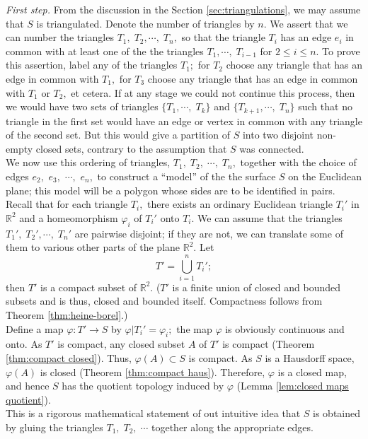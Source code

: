 \documentclass{article}
\theoremstyle{definition}
\begin{document}
\emph{First step.} From the discussion in the Section \ref{sec:triangulations}, we may assume that $S$ is triangulated. Denote the number of triangles by $n.$ We assert that we can number the triangles $T_1,\; T_2, \cdots,\; T_n,$ so that the triangle $T_i$ has an edge $e_i$ in common with at least one of the the triangles $T_1, \cdots,\; T_{i-1}$ for $2 \le i \le n.$ To prove this assertion, label any of the triangles $T_1;$ for $T_2$ choose any triangle that has an edge in common with $T_1,$ for $T_3$ choose any triangle that has an edge in common with $T_1$ or $T_2,$ et cetera. If at any stage we could not continue this process, then we would have two sets of triangles $\{T_1, \cdots,\; T_k\}$ and $\{T_{k+1}, \cdots,\; T_n\}$ such that no triangle in the first set would have an edge or vertex in common with any triangle of the second set. But this would give a partition of $S$ into two disjoint non-empty closed sets, contrary to the assumption that $S$ was connected.\\
We now use this ordering of triangles, $T_1,\;T_2,\;\cdots,\;T_n,$ together with the choice of edges $e_2,$ $e_3,$ $\cdots,$ $e_n,$ to construct a ``model'' of the the surface $S$ on the Euclidean plane; this model will be a polygon whose sides are to be identified in pairs. Recall that for each triangle $T_i,$ there exists an ordinary Euclidean triangle $T_i'$ in $\mathbb{R}^2$ and a homeomorphism $\varphi_i$ of $T_i'$ onto $T_i.$ We can assume that the triangles $T_1',\;T_2',\cdots,\;T_n'$ are pairwise disjoint; if they are not, we can translate some of them to various other parts of the plane $\mathbb{R}^2.$ Let
\[T' = \bigcup_{i=1}^nT_i';\]
then $T'$ is a compact subset of $\mathbb{R}^2.$ ($T'$ is a finite union of closed and bounded subsets and is thus, closed and bounded itself. Compactness follows from Theorem \ref{thm:heine-borel}.)\\
Define a map $\varphi:T'\longrightarrow S$ by $\varphi|T_i' = \varphi_i;$ the map $\varphi$ is obviously continuous and onto. As $T'$ is compact, any closed subset $A$ of $T'$ is compact (Theorem \ref{thm:compact closed}). Thus, $\varphi(A) \subset S$ is compact. As $S$ is a Hausdorff space, $\varphi(A)$ is closed (Theorem \ref{thm:compact haus}). Therefore, $\varphi$ is a closed map, and hence $S$ has the quotient topology induced by $\varphi$ (Lemma \ref{lem:closed maps quotient}).\\
This is a rigorous mathematical statement of out intuitive idea that $S$ is obtained by gluing the triangles $T_1,\;T_2,\;\cdots$ together along the appropriate edges.\\
\end{document}
